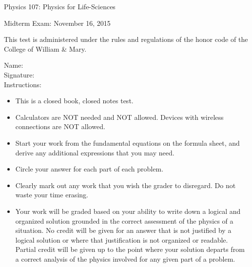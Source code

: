 \documentclass[letterpaper,addpoints,answers]{exam}
\begin{document}
\begin{coverpages}
 \large\bfseries
 
 \noindent 
 Physics 107: Physics for Life-Sciences

 \vspace{2ex}
 \noindent
 Midterm Exam: November 16, 2015

 \vspace{3ex}
 \noindent 
 This test is administered under the rules and regulations of the honor code of the College of William \& Mary.

 \vspace{2ex}
 \noindent 
 Name:\enspace\makebox[2.3in]{\hrulefill} \\

 \noindent 
 Signature:\enspace\makebox[2in]{\hrulefill} \\

 \vspace{5ex}
 \noindent 
 Instructions:
 \begin{itemize}
  \item This is a closed book, closed notes test.
  \item Calculators are NOT needed and NOT allowed. Devices with wireless connections are NOT allowed.
  \item Start your work from the fundamental equations on the formula sheet, and derive any additional expressions that you may need.
  \item Circle your answer for each part of each problem. 
  \item Clearly mark out any work that you wish the grader to disregard.  Do not waste your time erasing.
  \item Your work will be graded based on your ability to write down a logical and organized solution grounded in the correct assessment of the physics of a situation. No credit will be given for an answer that is not justified by a logical solution or where that justification is not organized or readable. Partial credit will be given up to the point where your solution departs from a correct analysis of the physics involved for any given part of a problem.
 \end{itemize}

 \pagebreak

 \begin{center}
  \gradetable[v][questions]
 \end{center}
 
\end{coverpages}
 
\end{document}
